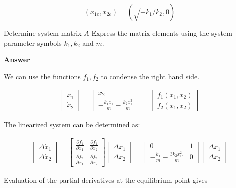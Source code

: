 \begin{equation}
(x_{1e}, x_{2e} ) = (\sqrt{-k_1/k_2}, 0) \nonumber
\end{equation}

Determine system matrix $A$ Express the matrix elements using the system parameter symbols $k_1, k_2$ and $m$. 

\textbf{Answer}

We can use the functions $f_1, f_2$ to condense the right hand side. 

\begin{eqnarray}
\begin{bmatrix}
 \dot{x}_1\\
 \dot{x}_2
\end{bmatrix}= 
\begin{bmatrix}
 x_2  \\
 -\frac{k_1 x_1}{m} - \frac{k_2 x_{1}^3}{m}  
\end{bmatrix}=
\begin{bmatrix}
 f_1(x_1, x_2)  \\
 f_2(x_1, x_2)  
\end{bmatrix} \nonumber
\end{eqnarray}

The linearized system can be determined as:

\begin{eqnarray}
\begin{bmatrix}
 \Delta \dot{x}_1\\
 \Delta \dot{x}_2
\end{bmatrix}= 
\begin{bmatrix}
 \frac{\partial f_1}{\partial x_1} & \frac{\partial f_1}{\partial x_2}   \\
 \frac{\partial f_2}{\partial x_1} & \frac{\partial f_2}{\partial x_2} 
\end{bmatrix}
\begin{bmatrix}
 \Delta x_1  \\
 \Delta x_2  
\end{bmatrix}=
\begin{bmatrix}
 0 & 1   \\
 -\frac{k_1}{m}-\frac{3k_2 x_{1e}^{2}}{m} & 0  
\end{bmatrix}
\begin{bmatrix}
 \Delta x_1  \\
 \Delta x_2  
\end{bmatrix} \nonumber
\end{eqnarray}

Evaluation of the partial derivatives at the equilibrium point gives


